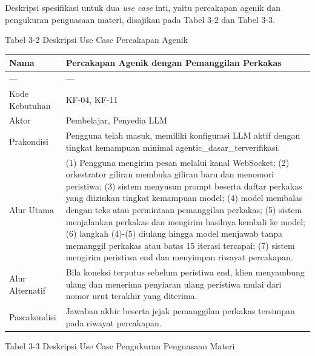 \documentclass[12pt,a4paper]{article}
\begin{document}
Deskripsi spesifikasi untuk dua \textit{use case} inti, yaitu percakapan agenik dan pengukuran penguasaan materi, disajikan pada Tabel 3-2 dan Tabel 3-3.

Tabel 3-2	Deskripsi Use Case Percakapan Agenik

\begin{table}[h]
\centering
\begin{tabular}{ll}
\toprule
Nama & Percakapan Agenik dengan Pemanggilan Perkakas \\
\midrule
--- & --- \\
Kode Kebutuhan & KF-04, KF-11 \\
Aktor & Pembelajar, Penyedia LLM \\
Prakondisi & Pengguna telah masuk, memiliki konfigurasi LLM aktif dengan tingkat kemampuan minimal agentic\_dasar\_terverifikasi. \\
Alur Utama & (1) Pengguna mengirim pesan melalui kanal WebSocket; (2) orkestrator giliran membuka giliran baru dan menomori peristiwa; (3) sistem menyusun prompt beserta daftar perkakas yang diizinkan tingkat kemampuan model; (4) model membalas dengan teks atau permintaan pemanggilan perkakas; (5) sistem menjalankan perkakas dan mengirim hasilnya kembali ke model; (6) langkah (4)-(5) diulang hingga model menjawab tanpa memanggil perkakas atau batas 15 iterasi tercapai; (7) sistem mengirim peristiwa end dan menyimpan riwayat percakapan. \\
Alur Alternatif & Bila koneksi terputus sebelum peristiwa end, klien menyambung ulang dan menerima penyiaran ulang peristiwa mulai dari nomor urut terakhir yang diterima. \\
Pascakondisi & Jawaban akhir beserta jejak pemanggilan perkakas tersimpan pada riwayat percakapan. \\
\bottomrule
\end{tabular}
\end{table}
Tabel 3-3	Deskripsi Use Case Pengukuran Penguasaan Materi
\end{document}
